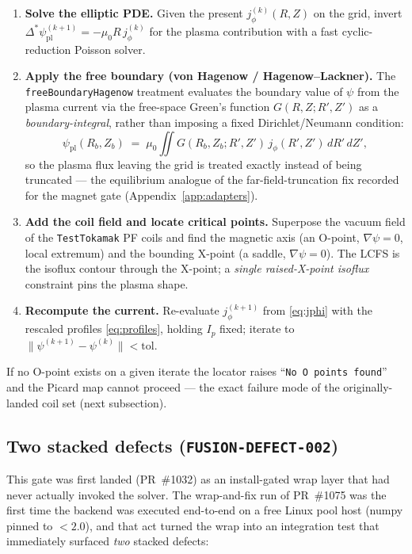 \begin{enumerate}\itemsep0.2em
\item \textbf{Solve the elliptic PDE.} Given the present
  $j_\phi^{(k)}(R,Z)$ on the grid, invert
  $\Delta^{*}\psi_{\text{pl}}^{(k+1)} = -\mu_0 R\,j_\phi^{(k)}$ for the
  plasma contribution with a fast cyclic-reduction Poisson solver.
\item \textbf{Apply the free boundary (von Hagenow / Hagenow--Lackner).}
  The \verb|freeBoundaryHagenow| treatment evaluates the boundary value of
  $\psi$ from the plasma current via the free-space Green's function
  $G(R,Z;R',Z')$ as a \emph{boundary-integral}, rather than imposing a
  fixed Dirichlet/Neumann condition:
  \begin{equation}
  \psi_{\text{pl}}(R_b,Z_b)
    \;=\;
    \mu_0\!\iint G(R_b,Z_b;R',Z')\,j_\phi(R',Z')\,dR'\,dZ',
  \label{eq:hagenow}
  \end{equation}
  so the plasma flux leaving the grid is treated exactly instead of being
  truncated --- the equilibrium analogue of the far-field-truncation fix
  recorded for the magnet gate (Appendix~\ref{app:adapters}).
\item \textbf{Add the coil field and locate critical points.} Superpose the
  vacuum field of the \texttt{TestTokamak} PF coils and find the magnetic
  axis (an O-point, $\nabla\psi=0$, local extremum) and the bounding
  X-point (a saddle, $\nabla\psi=0$). The LCFS is the isoflux contour
  through the X-point; a \emph{single raised-X-point isoflux} constraint
  pins the plasma shape.
\item \textbf{Recompute the current.} Re-evaluate $j_\phi^{(k+1)}$ from
  \eqref{eq:jphi} with the rescaled profiles \eqref{eq:profiles}, holding
  $I_p$ fixed; iterate to $\|\psi^{(k+1)}-\psi^{(k)}\|<\text{tol}$.
\end{enumerate}

If no O-point exists on a given iterate the locator raises
``\texttt{No O points found}'' and the Picard map cannot proceed --- the
exact failure mode of the originally-landed coil set (next subsection).

\subsection{Two stacked defects (\texttt{FUSION-DEFECT-002})}
\label{app:gs-defect}

This gate was first landed (PR~\#1032) as an install-gated wrap layer that
had never actually invoked the solver. The wrap-and-fix run of PR~\#1075
was the first time the backend was executed end-to-end on a free Linux
pool host (numpy pinned to $<\!2.0$), and that act turned the wrap into an
integration test that immediately surfaced \emph{two} stacked defects:

